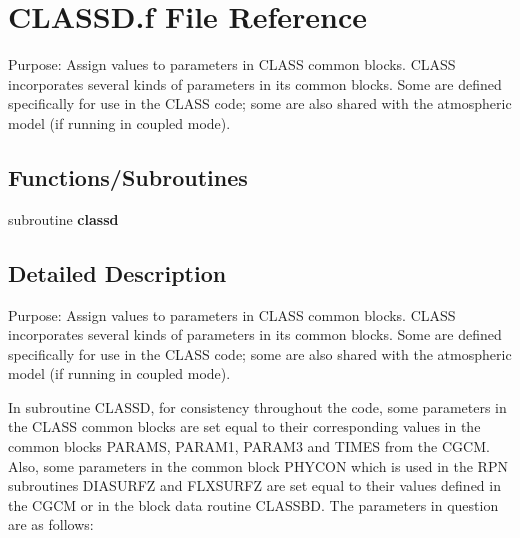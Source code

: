 \hypertarget{CLASSD_8f}{}\section{C\+L\+A\+S\+S\+D.\+f File Reference}
\label{CLASSD_8f}


Purpose\+: Assign values to parameters in C\+L\+A\+S\+S common blocks. C\+L\+A\+S\+S incorporates several kinds of parameters in its common blocks. Some are defined specifically for use in the C\+L\+A\+S\+S code; some are also shared with the atmospheric model (if running in coupled mode).  


\subsection*{Functions/\+Subroutines}
\begin{DoxyCompactItemize}
\item 
\hypertarget{CLASSD_8f_a0488b892c063c27c2ad69ed210df2bc5}{}subroutine {\bfseries classd}\label{CLASSD_8f_a0488b892c063c27c2ad69ed210df2bc5}

\end{DoxyCompactItemize}


\subsection{Detailed Description}
Purpose\+: Assign values to parameters in C\+L\+A\+S\+S common blocks. C\+L\+A\+S\+S incorporates several kinds of parameters in its common blocks. Some are defined specifically for use in the C\+L\+A\+S\+S code; some are also shared with the atmospheric model (if running in coupled mode). 

In subroutine C\+L\+A\+S\+S\+D, for consistency throughout the code, some parameters in the C\+L\+A\+S\+S common blocks are set equal to their corresponding values in the common blocks P\+A\+R\+A\+M\+S, P\+A\+R\+A\+M1, P\+A\+R\+A\+M3 and T\+I\+M\+E\+S from the C\+G\+C\+M. Also, some parameters in the common block P\+H\+Y\+C\+O\+N which is used in the R\+P\+N subroutines D\+I\+A\+S\+U\+R\+F\+Z and F\+L\+X\+S\+U\+R\+F\+Z are set equal to their values defined in the C\+G\+C\+M or in the block data routine C\+L\+A\+S\+S\+B\+D. The parameters in question are as follows\+:


